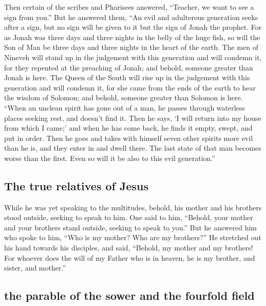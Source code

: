  Then certain of the scribes and Pharisees answered,
``Teacher, we want to see a sign from you.''  But he
answered them, ``An evil and adulterous generation seeks after a sign,
but no sign will be given to it but the sign of Jonah the prophet.
 For as Jonah was three days and three nights in the
belly of the huge fish, so will the Son of Man be three days and three
nights in the heart of the earth.  The men of Nineveh
will stand up in the judgement with this generation and will condemn it,
for they repented at the preaching of Jonah; and behold, someone greater
than Jonah is here.  The Queen of the South will rise up
in the judgement with this generation and will condemn it, for she came
from the ends of the earth to hear the wisdom of Solomon; and behold,
someone greater than Solomon is here.  ``When an unclean
spirit has gone out of a man, he passes through waterless places seeking
rest, and doesn't find it.  Then he says, `I will return
into my house from which I came;' and when he has come back, he finds it
empty, swept, and put in order.  Then he goes and takes
with himself seven other spirits more evil than he is, and they enter in
and dwell there. The last state of that man becomes worse than the
first. Even so will it be also to this evil generation.''

\hypertarget{the-true-relatives-of-jesus}{%
\subsection{The true relatives of
Jesus}\label{the-true-relatives-of-jesus}}

 While he was yet speaking to the multitudes, behold, his
mother and his brothers stood outside, seeking to speak to him.
 One said to him, ``Behold, your mother and your brothers
stand outside, seeking to speak to you.''  But he
answered him who spoke to him, ``Who is my mother? Who are my
brothers?''  He stretched out his hand towards his
disciples, and said, ``Behold, my mother and my brothers!
 For whoever does the will of my Father who is in heaven,
he is my brother, and sister, and mother.''

\hypertarget{the-parable-of-the-sower-and-the-fourfold-field}{%
\subsection{the parable of the sower and the fourfold
field}\label{the-parable-of-the-sower-and-the-fourfold-field}}

